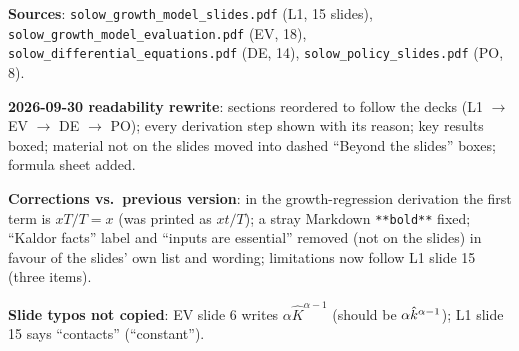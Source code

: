 \documentclass[11pt]{article}
\begin{document}
\begin{transcriptnotes}
  \item \textbf{Sources}: \texttt{solow\_growth\_model\_slides.pdf} (L1, 15 slides), \texttt{solow\_growth\_model\_evaluation.pdf} (EV, 18), \texttt{solow\_differential\_equations.pdf} (DE, 14), \texttt{solow\_policy\_slides.pdf} (PO, 8).
  \item \textbf{2026-09-30 readability rewrite}: sections reordered to follow the decks (L1 $\to$ EV $\to$ DE $\to$ PO); every derivation step shown with its reason; key results boxed; material not on the slides moved into dashed ``Beyond the slides'' boxes; formula sheet added.
  \item \textbf{Corrections vs.\ previous version}: in the growth-regression derivation the first term is $xT/T = x$ (was printed as $xt/T$); a stray Markdown \texttt{**bold**} fixed; ``Kaldor facts'' label and ``inputs are essential'' removed (not on the slides) in favour of the slides' own list and wording; limitations now follow L1 slide 15 (three items).
  \item \textbf{Slide typos not copied}: EV slide 6 writes $\alpha\hat K^{\alpha-1}$ (should be $\alpha\hat{k}^{\alpha-1}$); L1 slide 15 says ``contacts'' (``constant'').
\end{transcriptnotes}
\end{document}
